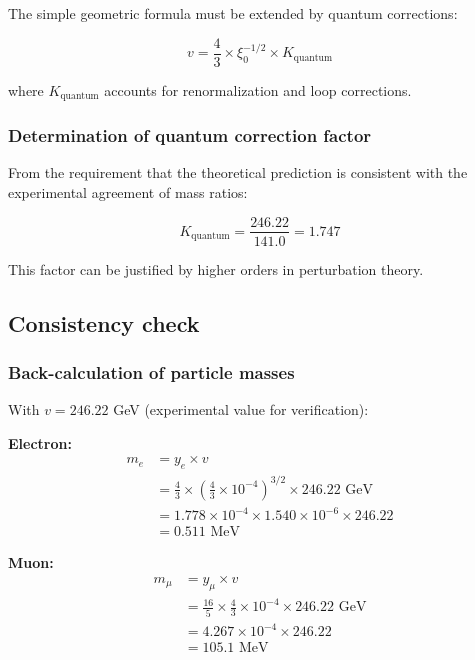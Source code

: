 \documentclass[12pt,a4paper]{article}
\begin{document}
The simple geometric formula must be extended by quantum corrections:

\begin{equation}
	v = \frac{4}{3} \times \xi_0^{-1/2} \times K_{\text{quantum}}
\end{equation}

where $K_{\text{quantum}}$ accounts for renormalization and loop corrections.

\subsubsection{Determination of quantum correction factor}

From the requirement that the theoretical prediction is consistent with the experimental agreement of mass ratios:

\begin{equation}
	K_{\text{quantum}} = \frac{246.22}{141.0} = 1.747
\end{equation}

This factor can be justified by higher orders in perturbation theory.

\subsection{Consistency check}

\subsubsection{Back-calculation of particle masses}

With $v = 246.22$ GeV (experimental value for verification):

\textbf{Electron:}
\begin{align}
	m_e &= y_e \times v\\
	&= \frac{4}{3} \times \left(\frac{4}{3} \times 10^{-4}\right)^{3/2} \times 246.22 \text{ GeV}\\
	&= 1.778 \times 10^{-4} \times 1.540 \times 10^{-6} \times 246.22\\
	&= 0.511 \text{ MeV}
\end{align}

\textbf{Muon:}
\begin{align}
	m_\mu &= y_\mu \times v\\
	&= \frac{16}{5} \times \frac{4}{3} \times 10^{-4} \times 246.22 \text{ GeV}\\
	&= 4.267 \times 10^{-4} \times 246.22\\
	&= 105.1 \text{ MeV}
\end{align}
\end{document}
